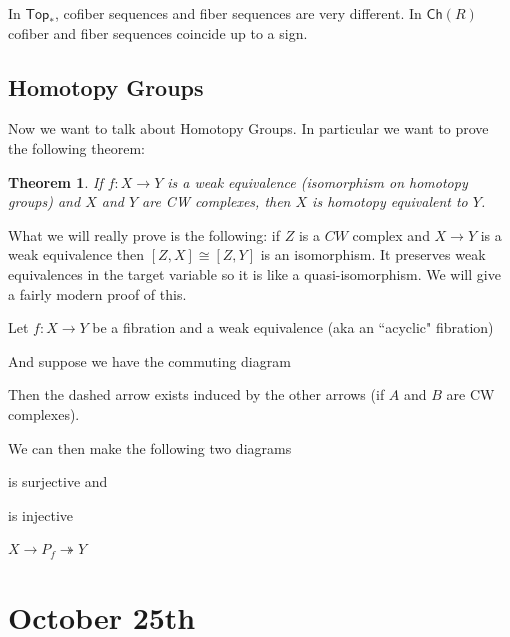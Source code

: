\documentclass[12pt]{article}
\newtheorem{theorem}{Theorem}[section]
\theoremstyle{definition}
\begin{document}
In $\mathsf{Top}_*$, cofiber sequences and fiber sequences are very different. In $\mathsf{Ch}(R)$ cofiber and fiber sequences coincide up to a sign. 

\subsection{Homotopy Groups}
Now we want to talk about Homotopy Groups. In particular we want to prove the following theorem:
\begin{theorem}
	If $f:X\to Y$ is a weak equivalence (isomorphism on homotopy groups) and $X$ and $Y$ are CW complexes, then $X$ is homotopy equivalent to $Y$.
\end{theorem}
What we will really prove is the following: if $Z$ is a $CW$ complex and $X\to Y$ is a weak equivalence then $[Z,X]\cong [Z,Y]$ is an isomorphism. It preserves weak equivalences in the target variable so it is like a quasi-isomorphism. We will give a fairly modern proof of this. 

Let $f:X\to Y$ be a fibration and a weak equivalence (aka an ``acyclic" fibration)

And suppose we have the commuting diagram\begin{center}
\end{center}
Then the dashed arrow exists induced by the other arrows (if $A$ and $B$ are CW complexes).

We can then make the following two diagrams
\begin{center}
	 is surjective and 
	 is injective
\end{center}
$X\to P_f\twoheadrightarrow Y$ 
\section{October 25th}
\end{document}
